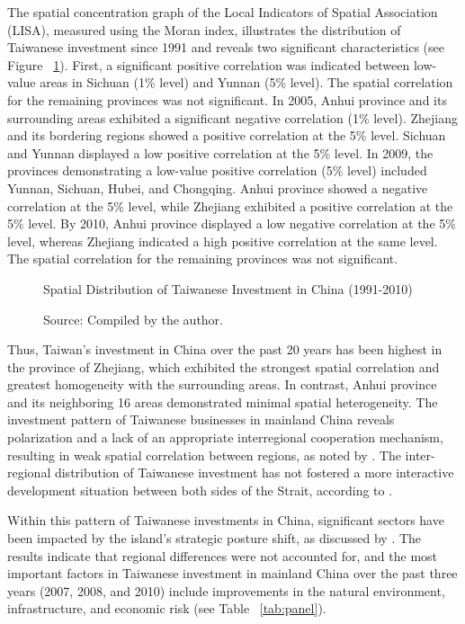 \documentclass{article}
\begin{document}
The spatial concentration graph of the Local Indicators of Spatial Association (LISA), measured using the Moran index, illustrates the distribution of Taiwanese investment since 1991 and reveals two significant characteristics (see Figure ~\ref{fig:china_map}). First, a significant positive correlation was indicated between low-value areas in Sichuan (1\% level) and Yunnan (5\% level). The spatial correlation for the remaining provinces was not significant. In 2005, Anhui province and its surrounding areas exhibited a significant negative correlation (1\% level). Zhejiang and its bordering regions showed a positive correlation at the 5\% level. Sichuan and Yunnan displayed a low positive correlation at the 5\% level. In 2009, the provinces demonstrating a low-value positive correlation (5\% level) included Yunnan, Sichuan, Hubei, and Chongqing. Anhui province showed a negative correlation at the 5\% level, while Zhejiang exhibited a positive correlation at the 5\% level. By 2010, Anhui province displayed a low negative correlation at the 5\% level, whereas Zhejiang indicated a high positive correlation at the same level. The spatial correlation for the remaining provinces was not significant.

\clearpage  %
\begin{figure}[H]
    \centering
    \caption{Spatial Distribution of Taiwanese Investment in China (1991-2010)}
    
    \label{fig:china_map}
    \vspace{14cm}
    \caption*{Source: Compiled by the author.}
\end{figure}


Thus, Taiwan's investment in China over the past 20 years has been highest in the province of Zhejiang, which exhibited the strongest spatial correlation and greatest homogeneity with the surrounding areas. In contrast, Anhui province and its neighboring 16 areas demonstrated minimal spatial heterogeneity. The investment pattern of Taiwanese businesses in mainland China reveals polarization and a lack of an appropriate interregional cooperation mechanism, resulting in weak spatial correlation between regions, as noted by \cite{alves_ml_wald_tests}. The inter-regional distribution of Taiwanese investment has not fostered a more interactive development situation between both sides of the Strait, according to \cite{yeung_what_you_need_to_know_china_taiwan_tensions}.

Within this pattern of Taiwanese investments in China, significant sectors have been impacted by the island's strategic posture shift, as discussed by \cite{yeung_what_you_need_to_know_china_taiwan_tensions}. The results indicate that regional differences were not accounted for, and the most important factors in Taiwanese investment in mainland China over the past three years (2007, 2008, and 2010) include improvements in the natural environment, infrastructure, and economic risk (see Table ~\ref{tab:panel}).
\end{document}
